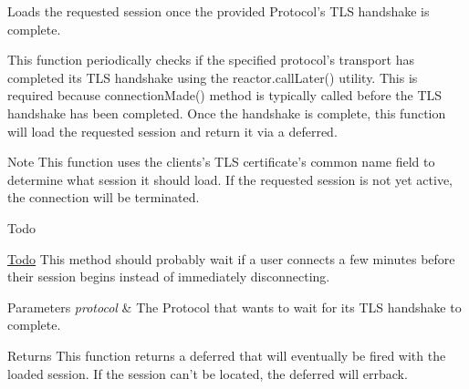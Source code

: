Loads the requested session once the provided Protocol's T\-L\-S handshake is complete. 

This function periodically checks if the specified protocol's transport has completed its T\-L\-S handshake using the reactor.\-call\-Later() utility. This is required because connection\-Made() method is typically called before the T\-L\-S handshake has been completed. Once the handshake is complete, this function will load the requested session and return it via a deferred.

\begin{DoxyNote}{Note}
This function uses the clients's T\-L\-S certificate's common name field to determine what session it should load. If the requested session is not yet active, the connection will be terminated.
\end{DoxyNote}
\begin{DoxyRefDesc}{Todo}
\item[\hyperlink{todo__todo000002}{Todo}]This method should probably wait if a user connects a few minutes before their session begins instead of immediately disconnecting.\end{DoxyRefDesc}



\begin{DoxyParams}{Parameters}
{\em protocol} & The Protocol that wants to wait for its T\-L\-S handshake to complete. \\
\hline
\end{DoxyParams}
\begin{DoxyReturn}{Returns}
This function returns a deferred that will eventually be fired with the loaded session. If the session can't be located, the deferred will errback. 
\end{DoxyReturn}
